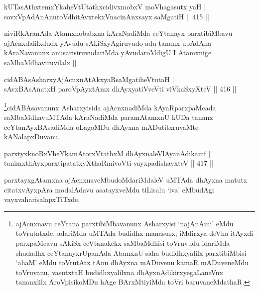 \begin{shl}
kUTasAthxtemxYkaheVtUtathxcidivxmobxV moVhagasutx yaH | \\
sovxVpAdAnAnuroVdhitAvxtekxVnacinAnxsayx saMgatiH \hfill||  415 || 
\end{shl}

\begin{artha}
niviRkAranAda Atamxnobabxna kAraNadiMda ceYtanayx parxtibiMbavu ajAcnxdalilxdudx yAvudu sAkiSxyAgiruvudo adu tananx upAdAna kAraNavanunx anusarisiruvudariMda yAvudaroMdigU I Atamxnige saMbaMdhaviruvilalx ||
\end{artha}


\begin{shl}
cidABAsAsharxyAjAcnxnAtAkxyaRsaMgatiheVtutaH | \\
sAvxBAsAnatxH paroV\s pAyxtAmx dhAyxyatiVveVti viVkaSxyXteV \hfill||  416 ||  
\end{shl}

\begin{artha}
\footnote{ajAcnxnavu ceYtana parxtibiMbavanunx Asharxyisi `najAnAmi' eMdu toVrutatxde. adariMda uMTAda budidhx manasusx, iMdirxya deVha itAyxdi parxpaMcavu sAkiSx ceVtanakekx saMbaMdhisi toVruvudu idariMda shudadhx ceYtanayxrUpanAda AtamxnU saha budidhxyalilx parxtibiMbisi `ahaM' eMdu toVrutAtx tAnu dhAyxna mADuvenu kamaR mADuveneMdu toVruvanu, vasutxtaH budidhxyalilxna dhAyxnAdikirxyegaLaneVnx tananxlilx AroVpisikoMDu hAge BArxMtiyiMda toVri baruvaneMdathaR.}cidABAsavanunx Asharxyisida ajAcnxnadiMda kAyaRparxpaMcada saMbaMdhavuMTAda kAraNadiMda paramAtamxnU kUDa tananx ceYtanAyxBAsadiMda oLagoMDu dhAyxna mADutitxruvaMte kANalapxDuvanu.
\end{artha}


\begin{shl}
parxtyxknoBxVheYkamAtorxVtathxM dhAyxnaleVlAyanAdikamf | \\
tanimxthAyxparxtipatatxyXthaRmivoVti vayxpadishayxteV \hfill||  417 ||  
\end{shl}

\begin{artha}
parxtayxgAtamxna ajAcnxnaveMbudoMdariMdaleV uMTAda dhAyxna matutx citatxvAyxpAra modalAdavu asatayxveMdu tiLisalu `iva' eMbudAgi vayxvaharisalapxTiTxde.
\end{artha}


